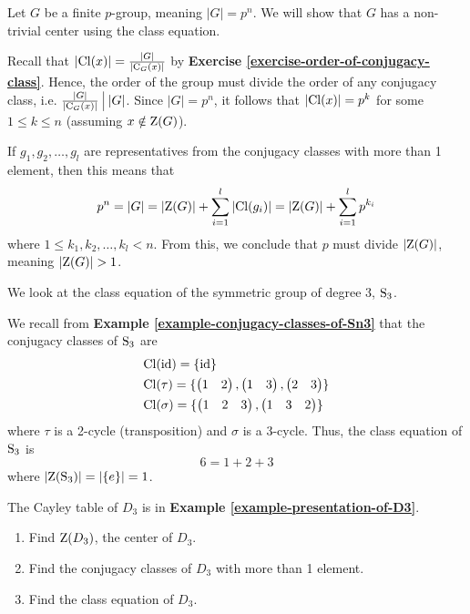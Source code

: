 \begin{example}\label{example-group-with-prime-power-order-has-non-trivial-center}
    Let $G$ be a finite $p$-group, meaning $|G| = p^n$. We will show that $G$ has a non-trivial center using the class equation.

    Recall that $|\mathrm{Cl}(x)| = \frac{|G|}{|\mathrm{C}_{G}(x)|}$ by \textbf{Exercise \ref{exercise-order-of-conjugacy-class}}. Hence, the order of the group must divide the order of any conjugacy class, i.e. $\frac{|G|}{|\C{G}{x}|} \vert |G|$. Since $|G| = p^n$, it follows that $|\mathrm{Cl}(x)| = p^k$ for some $1 \leq k \leq n$ (assuming $x \notin \mathrm{Z}(G)$).

    If $g_1, g_2, \dots, g_l$ are representatives from the conjugacy classes with more than 1 element, then this means that
    \[
        p^n = |G| = |\mathrm{Z}(G)| + \sum_{i=1}^l |\mathrm{Cl}(g_i)| = |\mathrm{Z}(G)| + \sum_{i=1}^l p^{k_i}
    \]
    where $1 \leq k_1, k_2, \dots, k_l < n$. From this, we conclude that $p$ must divide $|\mathrm{Z}(G)|$, meaning $|\mathrm{Z}(G)| > 1$.
\end{example}
\begin{example}
    We look at the class equation of the symmetric group of degree 3, $\mathrm{S}_{3}$.

    We recall from \textbf{Example \ref{example-conjugacy-classes-of-Sn3}} that the conjugacy classes of $\mathrm{S}_{3}$ are
    \begin{align*}
        &\mathrm{Cl}(\mathrm{id}) = \{\mathrm{id}\}\\
        &\mathrm{Cl}(\tau) = \{\begin{pmatrix}1 & 2\end{pmatrix}, \begin{pmatrix}1 & 3\end{pmatrix}, \begin{pmatrix}2 & 3\end{pmatrix}\}\\
        &\mathrm{Cl}(\sigma) = \{\begin{pmatrix}1 & 2 & 3\end{pmatrix}, \begin{pmatrix}1 & 3 & 2\end{pmatrix}\}
    \end{align*}
    where $\tau$ is a 2-cycle (transposition) and $\sigma$ is a 3-cycle. Thus, the class equation of $\mathrm{S}_{3}$ is
    \[
        6 = 1 + 2 + 3
    \]
    where $|\mathrm{Z}(\mathrm{S}_{3})| = |\{e\}| = 1$.
\end{example}

\begin{exercise}
    The Cayley table of $D_3$ is in \textbf{Example \ref{example-presentation-of-D3}}.
    \begin{enumerate}[label=(\alph*)]
        \item Find $\mathrm{Z}(D_3)$, the center of $D_3$.
        \item Find the conjugacy classes of $D_3$ with more than 1 element.
        \item Find the class equation of $D_3$.
    \end{enumerate}
\end{exercise}

